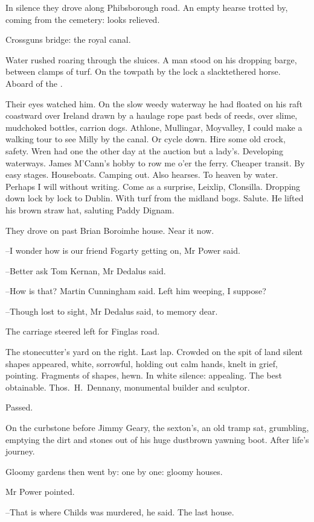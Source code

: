 In silence they drove along Phibsborough road.
An empty hearse trotted by, coming from the cemetery:
looks relieved.

Crossguns bridge:
the royal canal.

Water rushed roaring through the sluices.
A man stood on his
dropping barge, between clamps of turf.
On the towpath by the lock
a slacktethered horse.
Aboard of the .

Their eyes watched him.
On the slow weedy waterway
he had floated on his raft coastward over Ireland
drawn by a haulage rope
past beds of reeds,
over slime, mudchoked bottles, carrion dogs.
Athlone, Mullingar, Moyvalley,
I could make a walking tour to see Milly by the canal.
Or cycle down.
Hire some old crock, safety.
Wren had one the other day at the auction but a lady's.
Developing waterways.
James M'Cann's hobby to row me o'er the ferry.
Cheaper transit.
By easy stages.
Houseboats.
Camping out.
Also hearses.
To heaven by water.
Perhaps I will without writing.
Come as a surprise, Leixlip, Clonsilla.
Dropping down lock by lock to Dublin.
With turf from the midland bogs.
Salute.
He lifted his brown straw hat,
saluting Paddy Dignam.

They drove on past Brian Boroimhe house.
Near it now.

--I wonder how is our friend Fogarty getting on,
Mr Power said.

--Better ask Tom Kernan,
Mr Dedalus said.

--How is that?
Martin Cunningham said.
Left him weeping, I suppose?

--Though lost to sight,
Mr Dedalus said,
to memory dear.

The carriage steered left for Finglas road.

The stonecutter's yard on the right.
Last lap.
Crowded on the spit of land
silent shapes appeared,
white, sorrowful, holding out calm hands,
knelt in grief, pointing.
Fragments of shapes, hewn.
In white silence:
appealing.
The best obtainable.
Thos.~H.~Dennany, monumental builder and sculptor.

Passed.

On the curbstone before Jimmy Geary, the sexton's,
an old tramp sat, grumbling,
emptying the dirt and stones out of his huge dustbrown yawning boot.
After life's journey.

Gloomy gardens then went by:
one by one:
gloomy houses.

Mr Power pointed.

--That is where Childs was murdered,
he said.
The last house.

